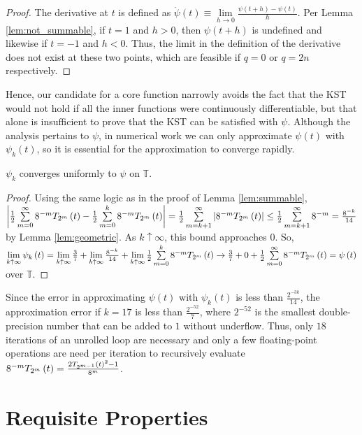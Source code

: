 \begin{proof}
  The derivative at $t$ is defined as $\dot{\psi}\left(t\right) \equiv \lim\limits_{h \rightarrow 0} \frac{\psi\left(t + h\right) - \psi\left(t\right)}{h}$. Per Lemma \ref{lem:not_summable}, if $t = 1$ and $h > 0$, then $\psi\left(t + h\right)$ is undefined and likewise if $t = -1$ and $h < 0$. Thus, the limit in the definition of the derivative does not exist at these two points, which are feasible if $q = 0$ or $q = 2n$ respectively.
\end{proof}
\noindent Hence, our candidate for a core function narrowly avoids the fact that the KST would not hold if all the inner functions were continuously differentiable, but that alone is insufficient to prove that the KST can be satisfied with $\psi$. Although the analysis pertains to $\psi$, in numerical work we can only approximate $\psi\left(t\right)$ with $\psi_k\left(t\right)$, so it is essential for the approximation to converge rapidly.

\begin{lemma}[]
  \label{lem:limit}
  $\psi_k$ converges uniformly to $\psi$ on $\mathbb{T}$.
\end{lemma}
\begin{proof}
  Using the same logic as in the proof of Lemma \ref{lem:summable}, $\left|\frac{1}{2} \sum\limits_{m = 0}^{\infty} 8^{-m} T_{2^{m}}\left(t\right) - \frac{1}{2} \sum\limits_{m = 0}^{k} 8^{-m} T_{2^{m}}\left(t\right)\right| = \frac{1}{2} \sum\limits_{m = k + 1}^\infty \left|8^{-m}T_{2^{m}}\left(t\right)\right| \leq \frac{1}{2} \sum\limits_{m = k + 1}^\infty 8^{-m} = \frac{8^{-k}}{14}$ by Lemma \ref{lem:geometric}. As $k \uparrow \infty$, this bound approaches $0$. So, $\lim\limits_{k \uparrow \infty}\psi_k\left(t\right) = \lim\limits_{k \uparrow \infty} \frac{3}{7} + \lim\limits_{k \uparrow \infty} \frac{8^{-k}}{14} + \lim\limits_{k \uparrow \infty} \frac{1}{2} \sum\limits_{m = 0}^{k} 8^{-m} T_{2^{m}}\left(t\right) \rightarrow \frac{3}{7} + 0 + \frac{1}{2} \sum\limits_{m = 0}^{\infty} 8^{-m} T_{2^{m}}\left(t\right) = \psi\left(t\right)$ over $\mathbb{T}$.
\end{proof}
\noindent Since the error in approximating $\psi\left(t\right)$ with $\psi_k\left(t\right)$ is less than $\frac{2^{-3k}}{14}$, the approximation error if $k = 17$ is less than $\frac{2^{-52}}{7}$, where $2^{-52}$ is the smallest double-precision number that can be added to $1$ without underflow. Thus, only $18$ iterations of an unrolled loop are necessary and only a few floating-point operations are need per iteration to recursively evaluate $8^{-m} T_{2^{m}}\left(t\right) = \frac{2T_{2^{m - 1}}\left(t\right)^2 - 1}{8^m}$.

\section{Requisite Properties}\label{sec:RequisiteProperties}

